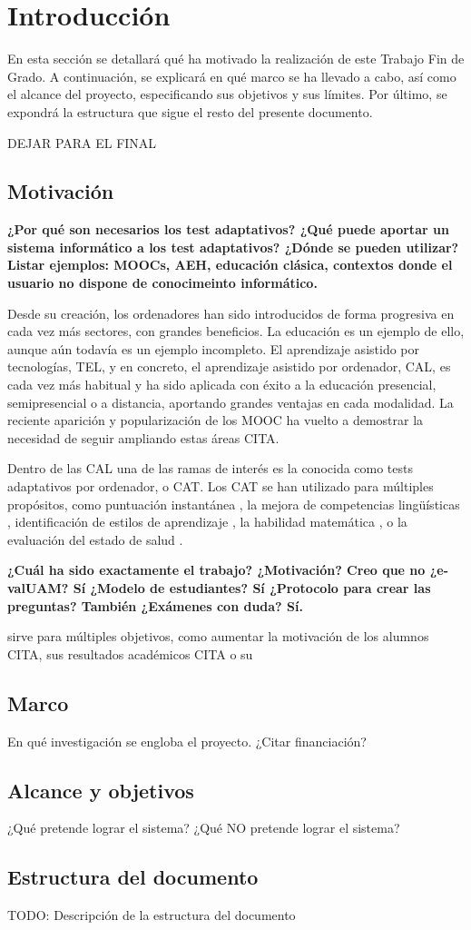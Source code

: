 \chapter{Introducción \label{sec:introduccion}}

En esta sección se detallará qué ha motivado la realización de este Trabajo Fin de Grado. A continuación, se explicará en qué marco se ha llevado a cabo, así como el alcance del proyecto, especificando sus objetivos y sus límites. Por último, se expondrá  la estructura que sigue el resto del presente documento.

DEJAR PARA EL FINAL

\section{Motivación}

\textbf{¿Por qué son necesarios los test adaptativos?
¿Qué puede aportar un sistema informático a los test adaptativos?
¿Dónde se pueden utilizar?
Listar ejemplos: MOOCs, AEH, educación clásica, contextos donde el usuario no dispone de conocimeinto informático.}

Desde su creación, los ordenadores han sido introducidos de forma progresiva en cada vez más sectores, con grandes beneficios. La educación es un ejemplo de ello, aunque aún todavía es un ejemplo incompleto. El aprendizaje asistido por tecnologías, \acrshort{TEL}, y en concreto, el aprendizaje asistido por ordenador, \acrshort{CAL}, 
es cada vez más habitual y ha sido aplicada con éxito a la educación presencial, semipresencial o a distancia, aportando grandes ventajas en cada modalidad. La reciente aparición y popularización de los \acrshort{MOOC} ha vuelto a demostrar la necesidad de seguir ampliando estas áreas {CITA}.

Dentro de las \acrshort{CAL} una de las ramas de interés es la conocida como tests adaptativos por ordenador, o \acrshort{CAT}. Los \acrshort{CAT} se han utilizado para múltiples propósitos, como puntuación instantánea \cite{Wainer00}, la mejora de  competencias lingüísticas \cite{Chapelle06} , identificación de estilos de aprendizaje \cite{Ortigosa10}, la habilidad matemática \cite{Klinkenberg11}, o la evaluación del estado de salud \cite{Revicki97}.

\textbf{¿Cuál ha sido exactamente el trabajo? ¿Motivación? Creo que no ¿e-valUAM? Sí ¿Modelo de estudiantes? Sí ¿Protocolo para crear las preguntas? También ¿Exámenes con duda? Sí.}

 sirve para múltiples objetivos, como aumentar la motivación de los alumnos {CITA}, sus resultados académicos {CITA} o su 

\section{Marco}

En qué investigación se engloba el proyecto. ¿Citar financiación?

\section{Alcance y objetivos}

¿Qué pretende lograr el sistema?
¿Qué NO pretende lograr el sistema?

\section{Estructura del documento}

TODO: Descripción de la estructura del documento